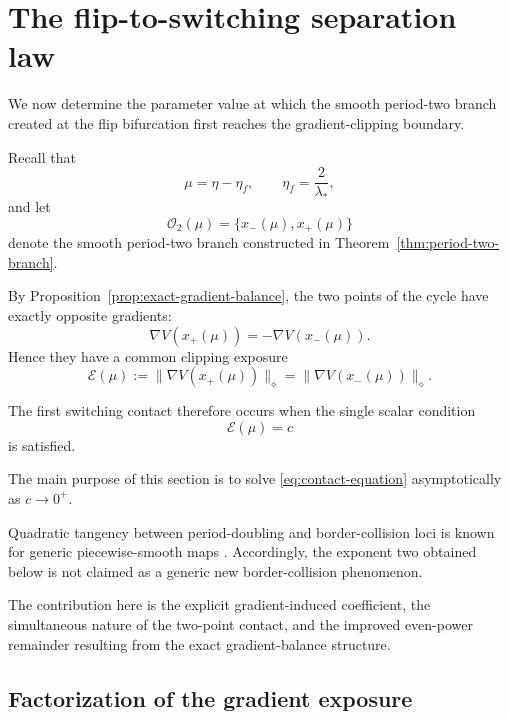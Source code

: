 
\section{The flip-to-switching separation law}
\label{sec:separation-law}

We now determine the parameter value at which the smooth
period-two branch created at the flip bifurcation first reaches the
gradient-clipping boundary.

Recall that
\[
\mu=\eta-\eta_f,
\qquad
\eta_f=\frac{2}{\lambda_*},
\]
and let
\[
\mathcal O_2(\mu)
=
\{x_-(\mu),x_+(\mu)\}
\]
denote the smooth period-two branch constructed in
Theorem~\ref{thm:period-two-branch}.

By Proposition~\ref{prop:exact-gradient-balance}, the two points of
the cycle have exactly opposite gradients:
\[
\nabla V(x_+(\mu))
=
-\nabla V(x_-(\mu)).
\]
Hence they have a common clipping exposure
\begin{equation}
\mathscr E(\mu)
:=
\|\nabla V(x_+(\mu))\|_\diamond
=
\|\nabla V(x_-(\mu))\|_\diamond.
\label{eq:section5-exposure}
\end{equation}

The first switching contact therefore occurs when the single scalar
condition
\begin{equation}
\mathscr E(\mu)=c
\label{eq:contact-equation}
\end{equation}
is satisfied.

The main purpose of this section is to solve
\eqref{eq:contact-equation} asymptotically as $c\to0^+$.

Quadratic tangency between period-doubling and border-collision
loci is known for generic piecewise-smooth maps
\cite{SimpsonMeiss2009}.
Accordingly, the exponent two obtained below is not claimed as a
generic new border-collision phenomenon.

The contribution here is the explicit gradient-induced coefficient,
the simultaneous nature of the two-point contact, and the improved
even-power remainder resulting from the exact gradient-balance
structure.

\subsection{Factorization of the gradient exposure}
\label{subsec:exposure-factorization}

